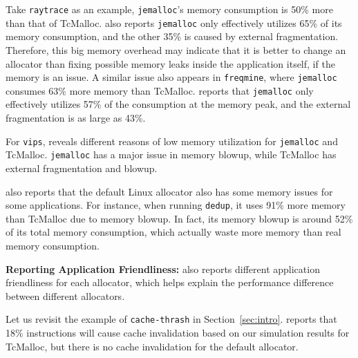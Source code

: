 Take \texttt{raytrace} as an example,  \texttt{jemalloc}'s memory consumption is 50\% more than that of TcMalloc. \MP{} also reports \texttt{jemalloc} only effectively utilizes 65\% of its memory consumption, and the other 35\% is caused by external fragmentation. Therefore, this big memory overhead may indicate that it is better to change an allocator than fixing possible memory leaks inside the application itself, if the memory is an issue. A similar issue also appears in \texttt{freqmine}, where \texttt{jemalloc} consumes 63\% more memory than TcMalloc.
\MP{} reports that \texttt{jemalloc} only effectively utilizes 57\% of the consumption at the memory peak, and the external fragmentation is as large as 43\%.

For \texttt{vips}, \MP{} reveals different reasons of low memory utilization for \texttt{jemalloc} and TcMalloc. \texttt{jemalloc} has a major issue in memory blowup, while TcMalloc has external fragmentation and blowup.

\MP{} also reports that the default Linux allocator also has some memory issues for some applications. For instance, when running \texttt{dedup}, it uses 91\% more memory than TcMalloc due to memory blowup. In fact, its memory blowup is around 52\% of its total memory consumption, which actually waste more memory than real memory consumption.


\textbf{Reporting Application Friendliness:} 
\MP{} also reports different application friendliness for each allocator, which helps explain the performance difference between different allocators. 

Let us revisit the example of \texttt{cache-thrash} in Section~\ref{sec:intro}. \MP{} reports that 18\% instructions will cause cache invalidation based on our simulation results for TcMalloc, but there is no cache invalidation for the default allocator. 


